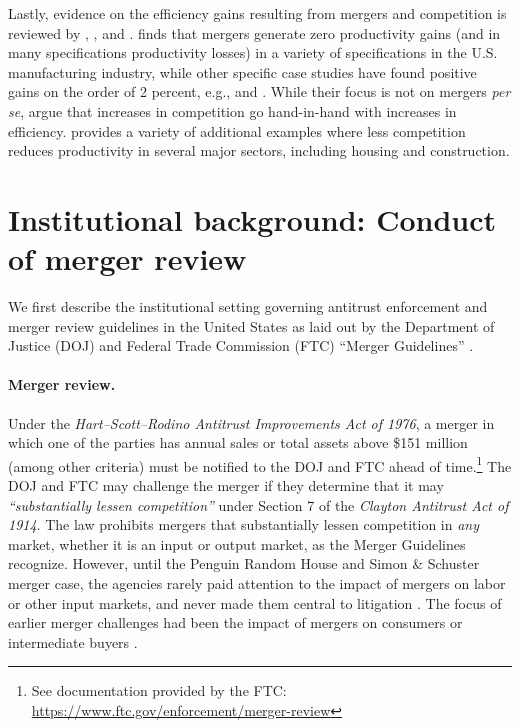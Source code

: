 \documentclass[12pt]{article}
\theoremstyle{prop}
\begin{document}
Lastly, evidence on the efficiency gains resulting from mergers and competition is reviewed by \citet{blonigen2016evidence}, \citet{holmes2010competition}, and \citet{schmitz2020monopolies}. 
\citet{blonigen2016evidence} finds that mergers generate zero productivity gains (and in many specifications productivity losses) in a variety of specifications in the U.S. manufacturing industry, while other specific case studies have found positive gains on the order of 2 percent, e.g., \citet{ashenfelter2015efficiencies} and \citet{bonnet2020empirical}. 
While their focus is not on mergers \textit{per se}, \citet{holmes2010competition} argue that increases in competition go hand-in-hand with increases in efficiency. 
\citet{schmitz2020monopolies} provides a variety of additional examples where less competition reduces productivity in several major sectors, including housing and construction.
 

\section{Institutional background: Conduct of merger review}\label{sec:background}
 
We first describe the institutional setting governing antitrust enforcement and merger review guidelines in the United States as laid out by the Department of Justice (DOJ) and Federal Trade Commission (FTC) ``Merger Guidelines'' \citep{doj2023final}.  

\paragraph{Merger review.} 
Under the \emph{Hart–Scott–Rodino Antitrust Improvements Act of 1976}, a merger in which one of the parties has annual sales or total assets above \$151 million (among other criteria) must be notified to the DOJ and FTC ahead of time.\footnote{See documentation provided by the FTC:  \url{https://www.ftc.gov/enforcement/merger-review} } 
The DOJ and FTC may challenge the merger if they determine that it may \emph{``substantially lessen competition''} under Section 7 of the \emph{Clayton Antitrust Act of 1914}. 
The law prohibits mergers that substantially lessen competition in \textit{any} market, whether it is an input or output market, as the Merger Guidelines recognize. 
However, until  the Penguin Random House and Simon \& Schuster merger case, the agencies rarely paid attention to the impact of mergers on labor or other input markets, and never made them central to litigation \citep{penguin2022}. 
The focus of earlier merger challenges had been the impact of mergers on consumers or intermediate buyers \citep[e.g.][]{oecd2022}. 
\end{document}
